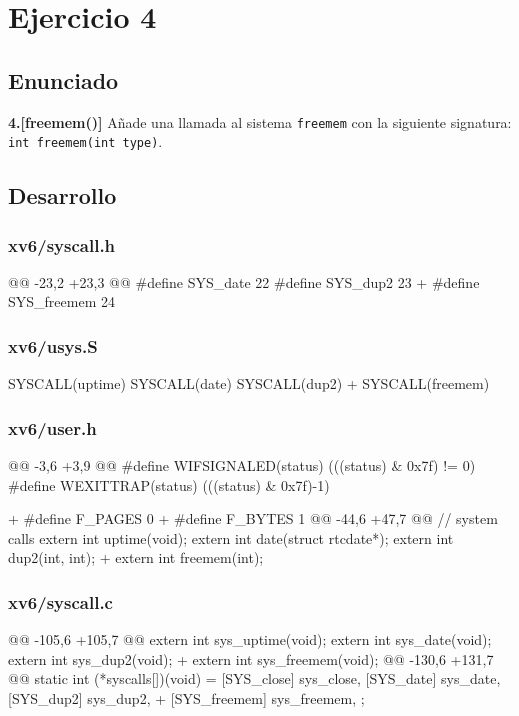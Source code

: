 \section{Ejercicio 4}
\subsection{Enunciado}
\begin{ejer}
    \textbf{4.[freemem()]} Añade una llamada al sistema \texttt{freemem} con la siguiente 
    signatura: \texttt{int freemem(int type)}.
\end{ejer}
\subsection{Desarrollo}

\subsubsection{xv6/syscall.h}
\begin{listing}
@@ -23,2 +23,3 @@
    #define SYS_date   22
    #define SYS_dup2   23
+   #define SYS_freemem 24
\end{listing}

\subsubsection{xv6/usys.S}
\begin{listing}
    SYSCALL(uptime)
    SYSCALL(date)
    SYSCALL(dup2)
+   SYSCALL(freemem)
\end{listing}

\subsubsection{xv6/user.h}
\begin{listing}
@@ -3,6 +3,9 @@
    #define WIFSIGNALED(status) (((status) & 0x7f) != 0)
    #define WEXITTRAP(status)   (((status) & 0x7f)-1)

+   #define F_PAGES 0
+   #define F_BYTES 1
@@ -44,6 +47,7 @@ 
// system calls
    extern int uptime(void);
    extern int date(struct rtcdate*);
    extern int dup2(int, int);
+   extern int freemem(int);
\end{listing}

\subsubsection{xv6/syscall.c}
\begin{listing}
@@ -105,6 +105,7 @@
    extern int sys_uptime(void);
    extern int sys_date(void);
    extern int sys_dup2(void);
+   extern int sys_freemem(void);
@@ -130,6 +131,7 @@ static int (*syscalls[])(void) = {
    [SYS_close]   sys_close,
    [SYS_date]    sys_date,
    [SYS_dup2]    sys_dup2,
+   [SYS_freemem] sys_freemem,
    };
\end{listing}


